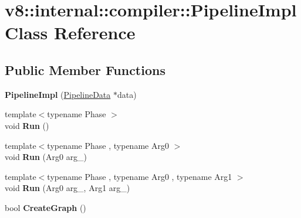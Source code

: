 \hypertarget{classv8_1_1internal_1_1compiler_1_1_pipeline_impl}{}\section{v8\+:\+:internal\+:\+:compiler\+:\+:Pipeline\+Impl Class Reference}
\label{classv8_1_1internal_1_1compiler_1_1_pipeline_impl}
\subsection*{Public Member Functions}
\begin{DoxyCompactItemize}
\item 
{\bfseries Pipeline\+Impl} (\hyperlink{classv8_1_1internal_1_1compiler_1_1_pipeline_data}{Pipeline\+Data} $\ast$data)\hypertarget{classv8_1_1internal_1_1compiler_1_1_pipeline_impl_a7c75662469b34411b3ef0749bfa60695}{}\label{classv8_1_1internal_1_1compiler_1_1_pipeline_impl_a7c75662469b34411b3ef0749bfa60695}

\item 
{\footnotesize template$<$typename Phase $>$ }\\void {\bfseries Run} ()\hypertarget{classv8_1_1internal_1_1compiler_1_1_pipeline_impl_aa22056694d9a71a732c2afb04e822d5a}{}\label{classv8_1_1internal_1_1compiler_1_1_pipeline_impl_aa22056694d9a71a732c2afb04e822d5a}

\item 
{\footnotesize template$<$typename Phase , typename Arg0 $>$ }\\void {\bfseries Run} (Arg0 arg\+\_)\hypertarget{classv8_1_1internal_1_1compiler_1_1_pipeline_impl_afb5bfe4ffc38769e7966deee37aa31a2}{}\label{classv8_1_1internal_1_1compiler_1_1_pipeline_impl_afb5bfe4ffc38769e7966deee37aa31a2}

\item 
{\footnotesize template$<$typename Phase , typename Arg0 , typename Arg1 $>$ }\\void {\bfseries Run} (Arg0 arg\+\_, Arg1 arg\+\_)\hypertarget{classv8_1_1internal_1_1compiler_1_1_pipeline_impl_ac1440054f93a94b0eac502a0617df912}{}\label{classv8_1_1internal_1_1compiler_1_1_pipeline_impl_ac1440054f93a94b0eac502a0617df912}

\item 
bool {\bfseries Create\+Graph} ()\hypertarget{classv8_1_1internal_1_1compiler_1_1_pipeline_impl_a3140c73fd272d19920b4aea085d3e2fc}{}\label{classv8_1_1internal_1_1compiler_1_1_pipeline_impl_a3140c73fd272d19920b4aea085d3e2fc}


\end{DoxyCompactItemize}
